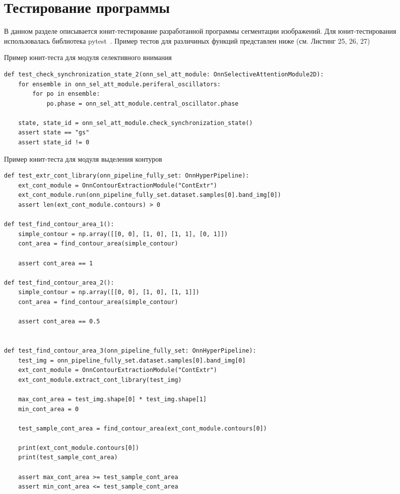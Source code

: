 \documentclass[14pt, russian]{scrartcl}
\begin{document}
\section{Тестирование программы}

В данном разделе описывается юнит-тестирование разработанной программы сегментации изображений. Для юнит-тестирования использовалась библиотека
pytest~\cite{3}. Пример тестов для различиных функций представлен ниже (см. Листинг 25, 26, 27)
\begin{listing}[!htt]
    \caption{Пример юнит-теста для модуля селективного внимания}
    \label{lst:contour_extr_sobel}
    \begin{verbatim}
def test_check_synchronization_state_2(onn_sel_att_module: OnnSelectiveAttentionModule2D):
    for ensemble in onn_sel_att_module.periferal_oscillators:
        for po in ensemble:
            po.phase = onn_sel_att_module.central_oscillator.phase

    state, state_id = onn_sel_att_module.check_synchronization_state()
    assert state == "gs"
    assert state_id != 0
    \end{verbatim}
\end{listing}

\begin{listing}[!htt]
    \caption{Пример юнит-теста для модуля выделения контуров}
    \label{lst:contour_extr_sobel}
    \begin{verbatim}
def test_extr_cont_library(onn_pipeline_fully_set: OnnHyperPipeline):
    ext_cont_module = OnnContourExtractionModule("ContExtr")
    ext_cont_module.run(onn_pipeline_fully_set.dataset.samples[0].band_img[0])
    assert len(ext_cont_module.contours) > 0

def test_find_contour_area_1():
    simple_contour = np.array([[0, 0], [1, 0], [1, 1], [0, 1]])
    cont_area = find_contour_area(simple_contour)

    assert cont_area == 1

def test_find_contour_area_2():
    simple_contour = np.array([[0, 0], [1, 0], [1, 1]])
    cont_area = find_contour_area(simple_contour)

    assert cont_area == 0.5


def test_find_contour_area_3(onn_pipeline_fully_set: OnnHyperPipeline):
    test_img = onn_pipeline_fully_set.dataset.samples[0].band_img[0]
    ext_cont_module = OnnContourExtractionModule("ContExtr")
    ext_cont_module.extract_cont_library(test_img)

    max_cont_area = test_img.shape[0] * test_img.shape[1]
    min_cont_area = 0

    test_sample_cont_area = find_contour_area(ext_cont_module.contours[0])

    print(ext_cont_module.contours[0])
    print(test_sample_cont_area)

    assert max_cont_area >= test_sample_cont_area
    assert min_cont_area <= test_sample_cont_area

    \end{verbatim}
\end{listing}
\end{document}
